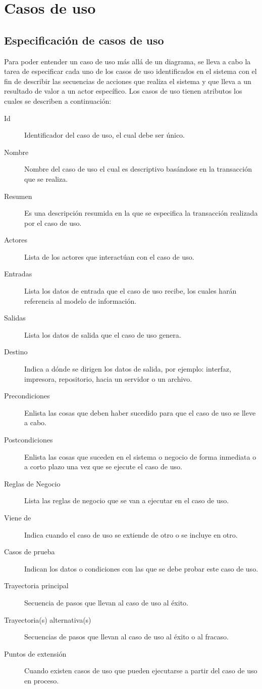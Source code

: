 \chapter{Casos de uso}


\section{Especificación de casos de uso}

Para poder entender un caso de uso más allá de un diagrama, se lleva a cabo la tarea de especificar cada uno de los casos de uso identificados en el sistema con el fin de describir las secuencias de acciones que realiza el sistema y que lleva a un resultado de valor a un actor específico. Los casos de uso tienen atributos los cuales se describen a continuación:

\begin{description}
	\item[Id] Identificador del caso de uso, el cual debe ser único.
	\item[Nombre] Nombre del caso de uso el cual es descriptivo basándose en la transacción que se realiza.
	\item[Resumen] Es una descripción resumida en la que se especifica la transacción realizada por el caso de uso.
	\item[Actores] Lista de los actores que interactúan con el caso de uso.
	\item[Entradas] Lista los datos de entrada que el caso de uso recibe, los cuales harán referencia al modelo de información.
	\item[Salidas] Lista los datos de salida que el caso de uso genera.
	\item[Destino] Indica a dónde se dirigen los datos de salida, por ejemplo: interfaz, impresora, repositorio, hacia un servidor o un archivo.
	\item[Precondiciones] Enlista las cosas que deben haber sucedido para que el caso  de uso se lleve a cabo.
	\item[Postcondiciones] Enlista las cosas que suceden en el sistema o negocio de forma inmediata o a corto plazo una vez que se ejecute el caso de uso.
	\item[Reglas de Negocio] Lista las reglas de negocio que se van a ejecutar en el caso de uso.
	\item[Viene de] Indica cuando el caso de uso se extiende de otro o se incluye en otro.
	\item[Casos de prueba] Indican los datos o condiciones con las que se debe probar este caso de uso.
	\item[Trayectoria principal] Secuencia de pasos que llevan al caso de uso al éxito.
	\item[Trayectoria(s) alternativa(s)] Secuencias de pasos que llevan al caso de uso al éxito o al fracaso.
	\item[Puntos de extensión] Cuando existen casos de uso que pueden ejecutarse a partir del caso de uso en proceso.
\end{description}

